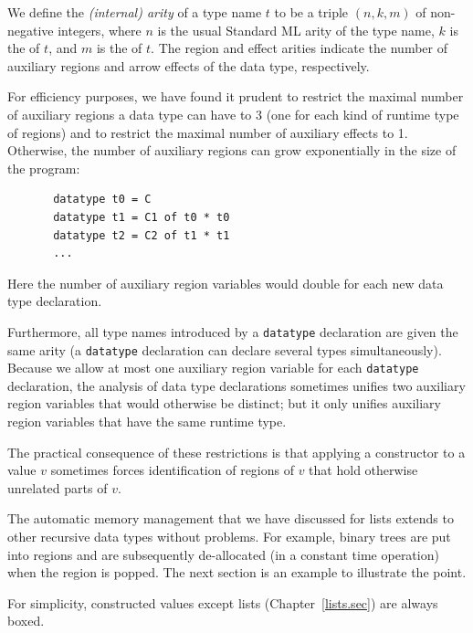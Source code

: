 \documentclass[12pt]{book}
\begin{document}
We define the {\em (internal) arity} of a type name $t$ to be a 
triple $(n,k,m)$ of non-negative integers, 
where $n$ is the usual Standard ML arity of the type name,
$k$ is the  of $t$, and $m$ is the  of 
$t$. The region and effect arities indicate the number of auxiliary regions
and arrow effects of the data type, respectively.

For efficiency purposes, we have found it prudent to restrict the maximal number
of auxiliary regions a data type can have to 3 
(one for each kind of runtime type of regions) and
to restrict the maximal number of auxiliary effects to 1.               
Otherwise, the number of auxiliary regions can grow exponentially in the
size of the program:
\begin{verbatim}
       datatype t0 = C
       datatype t1 = C1 of t0 * t0
       datatype t2 = C2 of t1 * t1
       ...
\end{verbatim}
Here the number of auxiliary region variables would double for each new data type
declaration. 

Furthermore, all type names introduced by a {\tt datatype} declaration are
given the same arity (a {\tt datatype} declaration can declare several
types simultaneously).
Because we allow at most one auxiliary region variable for each {\tt datatype}
declaration, the analysis of data type declarations sometimes unifies
two auxiliary region variables that would otherwise be distinct; but it only unifies auxiliary region
variables that have the same runtime type. 

The practical consequence of these restrictions is that 
applying a constructor to a value $v$ sometimes forces identification of regions
of $v$ that hold otherwise unrelated parts of $v$.

The automatic memory management that we have discussed for lists extends to
other recursive data types without problems. For example, binary trees
are put into regions and are subsequently de-allocated (in a constant time operation) when
the region is popped. The next section is an example 
to illustrate the point.

For simplicity, constructed values except lists (Chapter~\ref{lists.sec}) are always boxed. 
\end{document}

